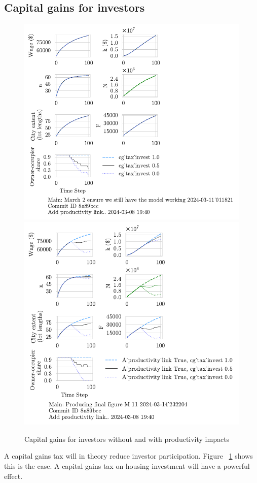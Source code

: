 \subsection{Capital gains for investors}
\begin{figure}[h!tb] 
    \centering
    \includegraphics[scale=.75, trim={0 1.4cm 4.5cm 0},clip]{fig/cg_tax_invest-Main-011821.pdf} 
    \includegraphics[scale=.75, trim={0 1.4cm 3.7cm 0},clip]{fig/With-productivity_linkcg_tax_invest-232204.pdf} 
    \caption{Capital gains for investors without and with productivity impacts}
    \label{fig:CG-invest_link_W-WO-Cost-of-capital}
\end{figure}
A capital gains tax will in theory reduce investor participation. Figure ~\ref{fig:CG-invest_link_W-WO-Cost-of-capital} shows this is the case. A capital gains tax on housing investment will have a powerful effect.

